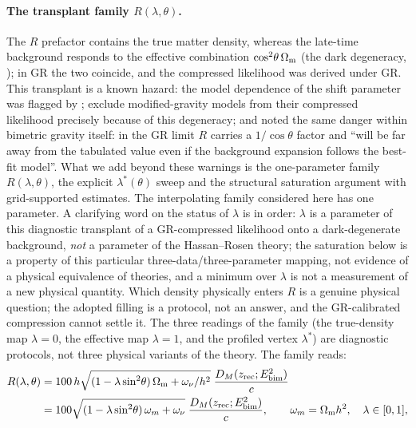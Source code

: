 \paragraph{The transplant family $R(\lambda,\theta)$.}
The $R$ prefactor contains the true matter density, whereas the late-time background responds to the effective combination $\cos^2\!\theta\,\Omega_{\mathrm m}$ (the dark degeneracy, \citealp{Kunz2009}); in GR the two coincide, and the compressed likelihood was derived under GR. This transplant is a known hazard: the model dependence of the shift parameter was flagged by \citet{Elgaroy2007}; \citet{Planck2015XIV} exclude modified-gravity models from their compressed likelihood precisely because of this degeneracy; and \citet[][Appendix~B]{Hogas2021b} noted the same danger within bimetric gravity itself: in the GR limit $R$ carries a $1/\cos\theta$ factor and ``will be far away from the tabulated value even if the background expansion follows the best-fit \LCDM{} model''. What we add beyond these warnings is the one-parameter family $R(\lambda,\theta)$, the explicit $\lambda^*(\theta)$ sweep and the structural saturation argument with grid-supported estimates. The interpolating family considered here has one parameter. A clarifying word on
the status of $\lambda$ is in order: $\lambda$ is a parameter of this
diagnostic transplant of a GR-compressed likelihood onto a dark-degenerate
background, \emph{not} a parameter of the Hassan--Rosen theory; the saturation
below is a property of this particular three-data/three-parameter mapping, not
evidence of a physical equivalence of theories, and a minimum over $\lambda$
is not a measurement of a new physical quantity. Which density physically enters $R$ is a genuine physical question; the adopted filling is a protocol, not an answer, and the GR-calibrated compression cannot settle it. The three readings of the family (the true-density map $\lambda=0$, the effective map $\lambda=1$, and the profiled vertex $\lambda^*$) are diagnostic protocols, not three physical variants of the theory. The family reads:
\begin{equation}
\begin{aligned}
R(\lambda,\theta)&=100\,h\sqrt{(1-\lambda\sin^2\!\theta)\,\Omega_{\mathrm m}+\omega_\nu/h^2}\;\frac{D_M(z_{\rm rec};E^2_{\rm bim})}{c}\\
&=100\sqrt{(1-\lambda\sin^2\!\theta)\,\omega_m+\omega_\nu}\;\frac{D_M(z_{\rm rec};E^2_{\rm bim})}{c},\qquad
\omega_m=\Omega_{\mathrm m} h^2,\quad\lambda\in[0,1],
\end{aligned}\label{eq:Rlambda}
\end{equation}
